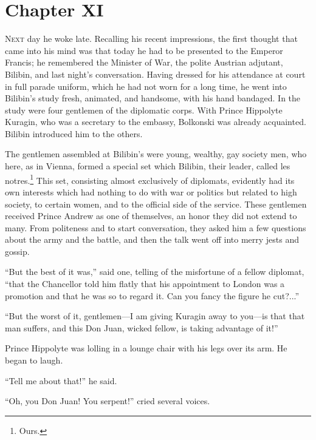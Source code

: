 \chapter*{Chapter XI}
\ifaudio     {} \fi

\lettrine[lines=2, loversize=0.3, lraise=0]{\initfamily N}{ext}
day he woke late. Recalling his recent impressions, the
first thought that came into his mind was that today he had to be
presented to the Emperor Francis; he remembered the Minister of
War, the polite Austrian adjutant, Bilibin, and last night's
conversation. Having dressed for his attendance at court in full
parade uniform, which he had not worn for a long time, he went
into Bilibin's study fresh, animated, and handsome, with his hand
bandaged. In the study were four gentlemen of the diplomatic
corps. With Prince Hippolyte Kuragin, who was a secretary to the
embassy, Bolkonski was already acquainted. Bilibin introduced him
to the others.

The gentlemen assembled at Bilibin's were young, wealthy, gay
society men, who here, as in Vienna, formed a special set which
Bilibin, their leader, called les notres.\footnote{Ours.} This
set, consisting almost exclusively of diplomats, evidently had
its own interests which had nothing to do with war or politics
but related to high society, to certain women, and to the
official side of the service. These gentlemen received Prince
Andrew as one of themselves, an honor they did not extend to
many. From politeness and to start conversation, they asked him a
few questions about the army and the battle, and then the talk
went off into merry jests and gossip.

``But the best of it was,'' said one, telling of the misfortune
of a fellow diplomat, ``that the Chancellor told him flatly that
his appointment to London was a promotion and that he was so to
regard it.  Can you fancy the figure he cut?...''

``But the worst of it, gentlemen---I am giving Kuragin away to
you---is that that man suffers, and this Don Juan, wicked fellow,
is taking advantage of it!''

Prince Hippolyte was lolling in a lounge chair with his legs over
its arm. He began to laugh.

``Tell me about that!'' he said.

``Oh, you Don Juan! You serpent!'' cried several voices.

